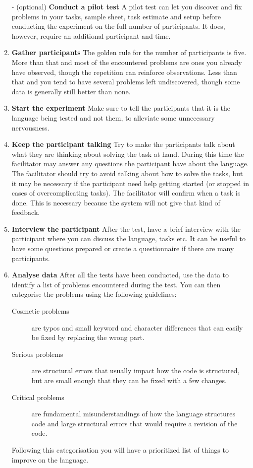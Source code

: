 \documentclass[preprint,10pt]{sigplanconf}
\begin{document}
\begin{enumerate}
\item[-] (optional) \textbf{Conduct a pilot test} A pilot test can let you discover and fix problems in your tasks, sample sheet, task estimate and setup before conducting the experiment on the full number of participants. It does, however, require an additional participant and time.
\item \textbf{Gather participants} The golden rule for the number of participants is five. More than that and most of the encountered problems are ones you already have observed, though the repetition can reinforce observations. Less than that and you tend to have several problems left undiscovered, though some data is generally still better than none.
\item \textbf{Start the experiment} Make sure to tell the participants that it is the language being tested and not them, to alleviate some unnecessary nervousness.
\item \textbf{Keep the participant talking} Try to make the participants talk about what they are thinking about solving the task at hand. During this time the facilitator may answer any questions the participant have about the language. The facilitator should try to avoid talking about how to solve the tasks, but it may be necessary if the participant need help getting started (or stopped in cases of overcomplicating tasks). The facilitator will confirm when a task is done. This is necessary because the system will not give that kind of feedback.
\item \textbf{Interview the participant} After the test, have a brief interview with the participant where you can discuss the language, tasks etc. It can be useful to have some questions prepared or create a questionnaire if there are many participants.
\item \textbf{Analyse data} After all the tests have been conducted, use the data to identify a list of problems encountered during the test. You can then categorise the problems using the following guidelines:
\begin{description}
\item[Cosmetic problems] are typos and small keyword and character differences that can easily be fixed by replacing the wrong part.
\item[Serious problems] are structural errors that usually impact how the code is structured, but are small enough that they can be fixed with a few changes.
\item[Critical problems] are fundamental misunderstandings of how the language structures code and large structural errors that would require a revision of the code.
\end{description}
Following this categorisation you will have a prioritized list of things to improve on the language.
\end{enumerate}
\end{document}
